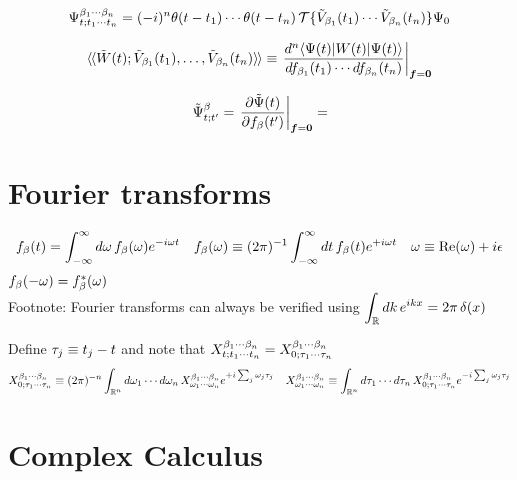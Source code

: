 \documentclass[11pt]{article}
\numberwithin{equation}{section}
\begin{document}
\begin{ex}
\begin{align}
  \Psi ^{\beta _1\cdots \beta _n}_{t; t_1\cdots t_n}
=
  (-i)^n
  \theta (t-t_1)
  \cdots
  \theta (t-t_n)\,
  \mathcal{T}\{
    \tilde{V}_{\beta _1}(t_1)
  \cdots
    \tilde{V}_{\beta _n}(t_n)
  \}
  \Psi _0
\end{align}
\end{ex}

\begin{ntt}
\begin{align}
  \iip{\tl{W}(t); \tl{V}_{\b_1}(t_1),\ld,\tl{V}_{\b_n}(t_n)}
\equiv
  \left.
  \fd{^n
    \ip{\Y(t)|W(t)|\Y(t)}
  }{
    f_{\b_1}(t_1)
    \cd
    df_{\b_n}(t_n)
  }
  \right|_{\bm{f}=\bo{0}}
\end{align}
\end{ntt}

\begin{ex}
\begin{align}
  \tl{\Y}^{\b}_{t;t'}
=
  \left.
  \pd{\tl{\Y}(t)}{f_\b(t')}
  \right|_{\bm{f}=\bo{0}}
=
\end{align}
\end{ex}


\newpage
\section{Fourier transforms}


\begin{rmk}
\begin{align}
  f_\b(t)
=
  \int_{-\infty}^\infty
  d\w\,
  f_\b(\w)
  e^{-i\w t}
&&
  f_\b(\w)
\equiv
  (2\pi)^{-1}
  \int_{-\infty}^\infty
  dt\,
  f_\b(t)
  e^{+i\w t}
&&
  \w
\equiv
  \mr{Re}(\w)
+
  i\ev
\end{align}
$
  f_{\beta }(-\omega )
=
  f_{\beta }^*(\omega )
$\\
Footnote:
Fourier transforms can always be verified using
$\ds{
  \int_\mb{R}
  dk\,
  e^{ikx}
=
  2\pi\,\d(x)
}$
\end{rmk}


\begin{rmk}
Define $\tau _j\equiv t_j-t$
and note that
$
  X^{\beta _1\cdots \beta _n}_{t;t_1\cdots t_n}
=
  X^{\beta _1\cdots \beta _n}_{0;\tau _1\cdots \tau _n}
$
\begin{align}
  X^{\b_1\cd \b_n}_{0;\ta_1\cd \ta_n}
\equiv
  (2\pi)^{-n}
  \int_{\mb{R}^n}
  d\w_1\cd d\w_n\,
  X^{\b_1\cd \b_n}_{\w_1\cd\w_n}
  e^{+i\sum_j\w_j\ta_j}
&&
  X^{\b_1\cd \b_n}_{\w_1\cd\w_n}
\equiv
  \int_{\mb{R}^n}
  d\ta_1\cd d\ta_n\,
  X^{\b_1\cd \b_n}_{0;\ta_1\cd \ta_n}
  e^{-i\sum_j\w_j\ta_j}
\end{align}
\end{rmk}

\begin{rmk}
\end{rmk}

\newpage
\section{Complex Calculus}
\end{document}
